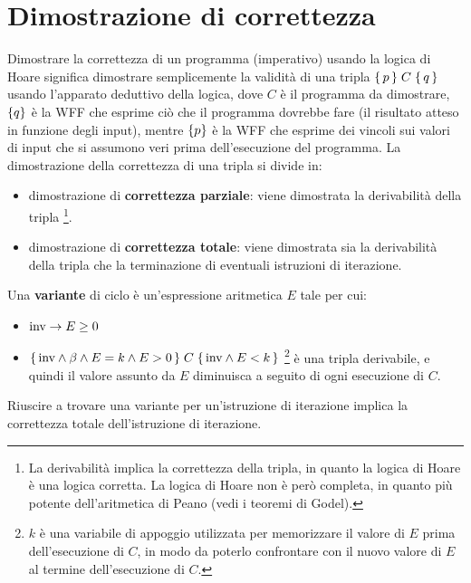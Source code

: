 \section{Dimostrazione di correttezza}
Dimostrare la correttezza di un programma (imperativo) usando la logica di Hoare significa dimostrare semplicemente la validità di una tripla $\Hoaretriple{p}{C}{q}$ usando l'apparato deduttivo della logica, dove $C$ è il programma da dimostrare, $\left\{q\right\}$ è la WFF che esprime ciò che il programma dovrebbe fare (il risultato atteso in funzione degli input), mentre $\left\{p\right\}$ è la WFF che esprime dei vincoli sui valori di input che si assumono veri prima dell'esecuzione del programma. La dimostrazione della correttezza di una tripla si divide in:
\begin{itemize}
    \item dimostrazione di \textbf{correttezza parziale}: viene dimostrata la derivabilità della tripla
    \footnote{La derivabilità implica la correttezza della tripla, in quanto la logica di Hoare è una logica corretta. La logica di Hoare non è però completa, in quanto più potente dell'aritmetica di Peano (vedi i teoremi di Godel).}.
    \item dimostrazione di \textbf{correttezza totale}: viene dimostrata sia la derivabilità della tripla che la terminazione di eventuali istruzioni di iterazione.
\end{itemize}
\begin{defn}
    Una \textbf{variante} di ciclo è un'espressione aritmetica $E$ tale per cui:
    \begin{itemize}
        \item $\textnormal{inv} \rightarrow E \ge 0$
        \item $\Hoaretriple{\tn{inv} \land \beta \land E = k \land E > 0}{C}{\tn{inv} \land E < k}$ \footnote{$k$ è una variabile di appoggio utilizzata per memorizzare il valore di $E$ prima dell'esecuzione di $C$, in modo da poterlo confrontare con il nuovo valore di $E$ al termine dell'esecuzione di $C$.} è una tripla derivabile, e quindi il valore assunto da $E$ diminuisca a seguito di ogni esecuzione di $C$.
    \end{itemize}
\end{defn}
Riuscire a trovare una variante per un'istruzione di iterazione implica la correttezza totale dell'istruzione di iterazione.

